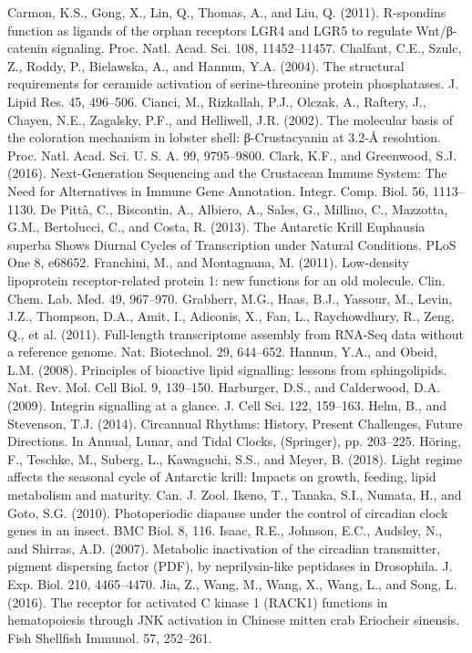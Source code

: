 Carmon, K.S., Gong, X., Lin, Q., Thomas, A., and Liu, Q. (2011). R-spondins function as ligands of the orphan receptors LGR4 and LGR5 to regulate Wnt/β-catenin signaling. Proc. Natl. Acad. Sci. 108, 11452–11457.
Chalfant, C.E., Szulc, Z., Roddy, P., Bielawska, A., and Hannun, Y.A. (2004). The structural requirements for ceramide activation of serine-threonine protein phosphatases. J. Lipid Res. 45, 496–506.
Cianci, M., Rizkallah, P.J., Olczak, A., Raftery, J., Chayen, N.E., Zagalsky, P.F., and Helliwell, J.R. (2002). The molecular basis of the coloration mechanism in lobster shell: β-Crustacyanin at 3.2-Å resolution. Proc. Natl. Acad. Sci. U. S. A. 99, 9795–9800.
Clark, K.F., and Greenwood, S.J. (2016). Next-Generation Sequencing and the Crustacean Immune System: The Need for Alternatives in Immune Gene Annotation. Integr. Comp. Biol. 56, 1113–1130.
De Pittà, C., Biscontin, A., Albiero, A., Sales, G., Millino, C., Mazzotta, G.M., Bertolucci, C., and Costa, R. (2013). The Antarctic Krill Euphausia superba Shows Diurnal Cycles of Transcription under Natural Conditions. PLoS One 8, e68652.
Franchini, M., and Montagnana, M. (2011). Low-density lipoprotein receptor-related protein 1: new functions for an old molecule. Clin. Chem. Lab. Med. 49, 967–970.
Grabherr, M.G., Haas, B.J., Yassour, M., Levin, J.Z., Thompson, D.A., Amit, I., Adiconis, X., Fan, L., Raychowdhury, R., Zeng, Q., et al. (2011). Full-length transcriptome assembly from RNA-Seq data without a reference genome. Nat. Biotechnol. 29, 644–652.
Hannun, Y.A., and Obeid, L.M. (2008). Principles of bioactive lipid signalling: lessons from sphingolipids. Nat. Rev. Mol. Cell Biol. 9, 139–150.
Harburger, D.S., and Calderwood, D.A. (2009). Integrin signalling at a glance. J. Cell Sci. 122, 159–163.
Helm, B., and Stevenson, T.J. (2014). Circannual Rhythms: History, Present Challenges, Future Directions. In Annual, Lunar, and Tidal Clocks, (Springer), pp. 203–225.
Höring, F., Teschke, M., Suberg, L., Kawaguchi, S.S., and Meyer, B. (2018). Light regime affects the seasonal cycle of Antarctic krill: Impacts on growth, feeding, lipid metabolism and maturity. Can. J. Zool.
Ikeno, T., Tanaka, S.I., Numata, H., and Goto, S.G. (2010). Photoperiodic diapause under the control of circadian clock genes in an insect. BMC Biol. 8, 116.
Isaac, R.E., Johnson, E.C., Audsley, N., and Shirras, A.D. (2007). Metabolic inactivation of the circadian transmitter, pigment dispersing factor (PDF), by neprilysin-like peptidases in Drosophila. J. Exp. Biol. 210, 4465–4470.
Jia, Z., Wang, M., Wang, X., Wang, L., and Song, L. (2016). The receptor for activated C kinase 1 (RACK1) functions in hematopoiesis through JNK activation in Chinese mitten crab Eriocheir sinensis. Fish Shellfish Immunol. 57, 252–261.

